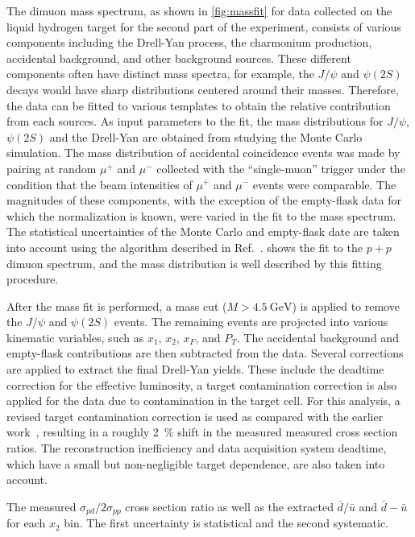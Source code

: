 \documentclass[reprint,aps,unsortedaddress,superscriptaddress,prl,floatfix,showpacs,linenumbers]{revtex4-2}
\begin{document}
The dimuon mass spectrum, as shown in \cref{fig:massfit} for data collected
on the liquid hydrogen target for the second part of the experiment, consists
of various components including the Drell-Yan process, the charmonium
production, accidental background, and other background sources.
These different components often have distinct mass spectra, for example, the $J/\psi$
and $\psi\left(2S\right)$ decays would have sharp distributions centered around their masses.
Therefore, the data can be fitted to various templates to obtain
the relative contribution from each sources.
As input parameters to the fit, the mass distributions for $J/\psi$, $\psi\left(2S\right)$
and the Drell-Yan are obtained from studying the Monte Carlo simulation. %
The mass distribution of accidental coincidence events was made by pairing at random $\mu^+$ and $\mu^-$ collected with the ``single-muon'' trigger
under the condition that the beam intensities of $\mu^+$ and $\mu^-$ events were comparable.
The magnitudes of these components,
with the exception of the empty-flask data for which the normalization is known,
were varied in the fit to the mass spectrum.
The statistical uncertainties of the Monte Carlo and empty-flask date are taken into account using the algorithm described in Ref.~\cite{barlow1993}.
 shows the fit to the $p+p$ dimuon spectrum,
and the mass distribution is well described by this fitting procedure.

After the mass fit is performed,
a mass cut ($M>\SI{4.5}{\GeV}$) is applied to remove the $J/\psi$ and $\psi\left(2S\right)$ events.
The remaining events are projected into various kinematic variables, such as $x_1$, $x_2$, $x_F$, and $P_T$.
The accidental background and empty-flask contributions are then subtracted from the data.
Several corrections are applied to extract the final Drell-Yan yields.
These include the deadtime correction for the effective luminosity,
a target contamination correction is also applied for the  data due to  contamination in the target cell.
For this analysis,
a revised target contamination correction is used as compared with the earlier work~\cite{dove2021,dove2023},
resulting in a roughly \SI{2}{\percent} shift in the measured measured cross section ratios.
The reconstruction inefficiency and data acquisition system deadtime, which have a small but non-negligible target dependence,
are also taken into account.

\begin{table}[htbp!]
	\centering
	\caption{The measured $\sigma_{pd}/2\sigma_{pp}$ cross section ratio as well
		as the extracted $\bar{d}/\bar{u}$ and $\bar{d}-\bar{u}$ for each $x_{2}$ bin.
		The first uncertainty is statistical and the second systematic.}
	\label{tab:dbarubar}
	\begin{adjustbox}{max width=\textwidth}
		
	\end{adjustbox}
\end{table}
\end{document}
